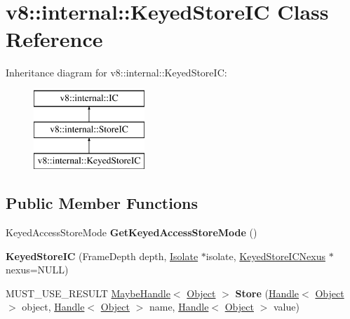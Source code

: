 \hypertarget{classv8_1_1internal_1_1_keyed_store_i_c}{}\section{v8\+:\+:internal\+:\+:Keyed\+Store\+IC Class Reference}
\label{classv8_1_1internal_1_1_keyed_store_i_c}
Inheritance diagram for v8\+:\+:internal\+:\+:Keyed\+Store\+IC\+:\begin{figure}[H]
\begin{center}
\leavevmode
\includegraphics[height=3.000000cm]{classv8_1_1internal_1_1_keyed_store_i_c}
\end{center}
\end{figure}
\subsection*{Public Member Functions}
\begin{DoxyCompactItemize}
\item 
Keyed\+Access\+Store\+Mode {\bfseries Get\+Keyed\+Access\+Store\+Mode} ()\hypertarget{classv8_1_1internal_1_1_keyed_store_i_c_a0d99a86f21d342854c18ee615f814287}{}\label{classv8_1_1internal_1_1_keyed_store_i_c_a0d99a86f21d342854c18ee615f814287}

\item 
{\bfseries Keyed\+Store\+IC} (Frame\+Depth depth, \hyperlink{classv8_1_1internal_1_1_isolate}{Isolate} $\ast$isolate, \hyperlink{classv8_1_1internal_1_1_keyed_store_i_c_nexus}{Keyed\+Store\+I\+C\+Nexus} $\ast$nexus=N\+U\+LL)\hypertarget{classv8_1_1internal_1_1_keyed_store_i_c_a22c1c024dbe25a0f5b0e54ffcffd0820}{}\label{classv8_1_1internal_1_1_keyed_store_i_c_a22c1c024dbe25a0f5b0e54ffcffd0820}

\item 
M\+U\+S\+T\+\_\+\+U\+S\+E\+\_\+\+R\+E\+S\+U\+LT \hyperlink{classv8_1_1internal_1_1_maybe_handle}{Maybe\+Handle}$<$ \hyperlink{classv8_1_1internal_1_1_object}{Object} $>$ {\bfseries Store} (\hyperlink{classv8_1_1internal_1_1_handle}{Handle}$<$ \hyperlink{classv8_1_1internal_1_1_object}{Object} $>$ object, \hyperlink{classv8_1_1internal_1_1_handle}{Handle}$<$ \hyperlink{classv8_1_1internal_1_1_object}{Object} $>$ name, \hyperlink{classv8_1_1internal_1_1_handle}{Handle}$<$ \hyperlink{classv8_1_1internal_1_1_object}{Object} $>$ value)\hypertarget{classv8_1_1internal_1_1_keyed_store_i_c_a10e43cfebb31810bfba3ff4ae22e0225}{}\label{classv8_1_1internal_1_1_keyed_store_i_c_a10e43cfebb31810bfba3ff4ae22e0225}

\end{DoxyCompactItemize}
